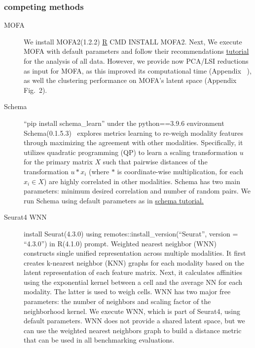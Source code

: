 \subsubsection{competing methods}
\begin{description}
\item[MOFA] 
We install MOFA2(1.2.2)\citep{tewari2017mofa} \href{from https://github.com/bioFAM/MOFA2} R CMD INSTALL MOFA2. Next, We execute MOFA with default parameters and follow their recommendations  \href{https://raw.githack.com/bioFAM/MOFA2_tutorials/master/R_tutorials/10x_scRNA_scATAC.html}{tutorial} for the analysis of all data. However, we provide now PCA/LSI reductions as input for MOFA, as this improved its computational time (Appendix ~), as well the clustering performance on MOFA's latent space (Appendix Fig.~2). 

\item[Schema]
``pip install schema\_learn'' under the python==3.9.6 environment
Schema(0.1.5.3)~\cite{singh2021schema} explores metrics learning to re-weigh modality features through maximizing the agreement with other modalities. Specifically, it utilizes quadratic programming (QP) to learn a scaling transformation $u$ for the primary matrix $X$ such that pairwise distances of the transformation $u *  x_i$ (where $*$ is coordinate-wise multiplication, for each $x_i\in X$) are highly correlated in other modalities. Schema has two main parameters: minimum desired correlation and number of random pairs.  We run Schema using default parameters as in 
\href{https://schema-multimodal.readthedocs.io/en/latest/recipes/index.html}{schema tutorial.} 

\item[Seurat4 WNN]
install Seurat(4.3.0) using remotes::install\_version(``Seurat'', version = ``4.3.0'') in R(4.1.0) prompt.
Weighted nearest neighbor (WNN)~\cite{hao2021seurat4} constructs single unified representation across multiple modalities. It first creates k-nearest neighbor (KNN) graphs for each modality based on the latent representation of each feature matrix.  Next, it calculates affinities using the exponential kernel between a cell and the average NN for each modality. The latter is used to weigh cells.  WNN has two major free parameters: the number of neighbors and scaling factor of the neighborhood kernel. We execute WNN, which is part of Seurat4, using default parameters. WNN does not provide a shared latent space, but we can use the weighted nearest neighbors graph to build a distance metric that can be used in all benchmarking evaluations.


\end{description}
